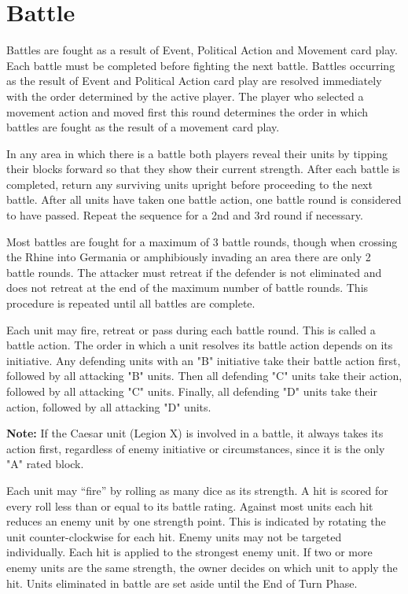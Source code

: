 \section{Battle}
\par
Battles are fought as a result of Event, Political Action and Movement card play. Each battle must be completed before fighting the next battle. Battles occurring as the result of Event and Political Action card play are resolved immediately with the order determined by the active player. The player who selected a movement action and moved first this round determines the order in which battles are fought as the result of a movement card play.

In any area in which there is a battle both players reveal their units by tipping their blocks forward so that they show their current strength. After each battle is completed, return any surviving units upright before proceeding to the next battle. After all units have taken one battle action, one battle round is considered to have passed. Repeat the sequence for a 2nd and 3rd round if necessary.

Most battles are fought for a maximum of 3 battle rounds, though when crossing the Rhine into Germania or amphibiously invading an area there are only 2 battle rounds. The attacker must retreat if the defender is not eliminated and does not retreat at the end of the maximum number of battle rounds. This procedure is repeated until all battles are complete.

Each unit may fire, retreat or pass during each battle round. This is called a battle action. The order in which a unit resolves its battle action depends on its initiative. Any defending units with an "B" initiative take their battle action first, followed by all attacking "B" units. Then all defending "C" units take their action, followed by all attacking "C" units. Finally, all defending "D" units take their action, followed by all attacking "D" units.

\textbf{Note:} If the Caesar unit (Legion X) is involved in a battle, it always takes its action first, regardless of enemy initiative or circumstances, since it is the only "A" rated block.

Each unit may “fire” by rolling as many dice as its strength. A hit is scored for every roll less than or equal to its battle rating. Against most units each hit reduces an enemy unit by one strength point. This is indicated by rotating the unit counter-clockwise for each hit. Enemy units may not be targeted individually. Each hit is applied to the strongest enemy unit. If two or more enemy units are the same strength, the owner decides on which unit to apply the hit. Units eliminated in battle are set aside until the End of Turn Phase.

